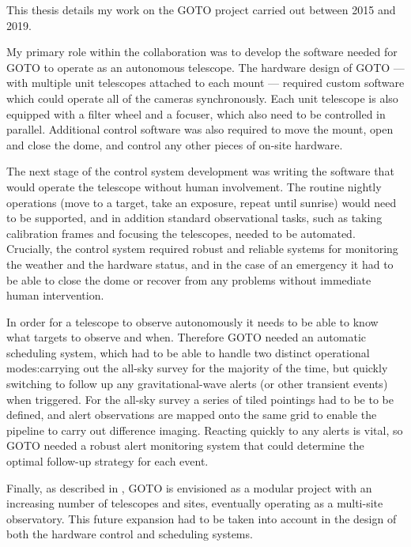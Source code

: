 \begin{colsection}

This thesis details my work on the GOTO project carried out between 2015 and 2019.

My primary role within the collaboration was to develop the software needed for GOTO to operate as an autonomous telescope. The hardware design of GOTO --- with multiple unit telescopes attached to each mount --- required custom software which could operate all of the cameras synchronously. Each unit telescope is also equipped with a filter wheel and a focuser, which also need to be controlled in parallel. Additional control software was also required to move the mount, open and close the dome, and control any other pieces of on-site hardware.

The next stage of the control system development was writing the software that would operate the telescope without human involvement. The routine nightly operations (move to a target, take an exposure, repeat until sunrise) would need to be supported, and in addition standard observational tasks, such as taking calibration frames and focusing the telescopes, needed to be automated. Crucially, the control system required robust and reliable systems for monitoring the weather and the hardware status, and in the case of an emergency it had to be able to close the dome or recover from any problems without immediate human intervention.

In order for a telescope to observe autonomously it needs to be able to know what targets to observe and when. Therefore GOTO needed an automatic scheduling system, which had to be able to handle two distinct operational modes:\@ carrying out the all-sky survey for the majority of the time, but quickly switching to follow up any gravitational-wave alerts (or other transient events) when triggered. For the all-sky survey a series of tiled pointings had to be to be defined, and alert observations are mapped onto the same grid to enable the pipeline to carry out difference imaging. Reacting quickly to any alerts is vital, so GOTO needed a robust alert monitoring system that could determine the optimal follow-up strategy for each event.

Finally, as described in , GOTO is envisioned as a modular project with an increasing number of telescopes and sites, eventually operating as a multi-site observatory. This future expansion had to be taken into account in the design of both the hardware control and scheduling systems.


\end{colsection}
